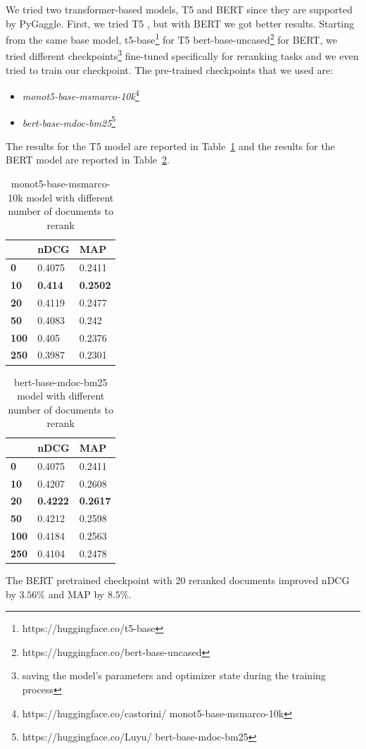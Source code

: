 We tried two transformer-based models, T5 and BERT since they are supported by PyGaggle. First, we tried T5 \cite{RaffelShazeerRobertsLeeNarangMatenaZhouLiLiuT5}, but with BERT \cite{devlin2019bert} we got better results. Starting from the same base model, t5-base\footnote{https://huggingface.co/t5-base} for T5 bert-base-uncased\footnote{https://huggingface.co/bert-base-uncased} for BERT, we tried different checkpoints\footnote{saving the model's parameters and optimizer state during the training process} fine-tuned specifically for reranking tasks and we even tried to train our checkpoint. The pre-trained checkpoints that we used are: 
\begin{itemize}
\item \textit{monot5-base-msmarco-10k}\footnote{https://huggingface.co/castorini/
monot5-base-msmarco-10k}
\item \textit{bert-base-mdoc-bm25}\footnote{https://huggingface.co/Luyu/
bert-base-mdoc-bm25}
\end{itemize}
The results for the T5 model are reported in Table~\ref{tab:t5-msmarco} and the results for the BERT model are reported in Table~\ref{tab:bert-mdoc}.
\begin{table}[tbp]
\caption{\label{tab:t5-msmarco} monot5-base-msmarco-10k model with different number of documents to rerank}
\begin{tabular}{|l|l|l|}
\toprule
             & \textbf{nDCG} & \textbf{MAP} \\ 
\midrule
\textbf{0}   & 0.4075        & 0.2411       \\ 
\textbf{10}  & \textbf{0.414}         & \textbf{0.2502}       \\ 
\textbf{20}  & 0.4119        & 0.2477       \\ 
\textbf{50}  & 0.4083        & 0.242        \\ 
\textbf{100} & 0.405         & 0.2376       \\ 
\textbf{250} & 0.3987        & 0.2301\\
\bottomrule
\end{tabular}
\end{table}

\begin{table}[tbp]
\caption{\label{tab:bert-mdoc}bert-base-mdoc-bm25 model with different number of documents to rerank}
\begin{tabular}{|l|l|l|}
\toprule
             & \textbf{nDCG} & \textbf{MAP} \\ 
\midrule
\textbf{0}   & 0.4075        & 0.2411       \\ 
\textbf{10}  & 0.4207         & 0.2608       \\ 
\textbf{20}  & \textbf{0.4222}        & \textbf{0.2617}       \\ 
\textbf{50}  & 0.4212        & 0.2598        \\ 
\textbf{100} & 0.4184         & 0.2563       \\ 
\textbf{250} & 0.4104        & 0.2478      \\
\bottomrule
\end{tabular}
\end{table}
The BERT pretrained checkpoint with 20 reranked documents improved \ac{nDCG} by $3.56\%$ and \ac{MAP} by $8.5\%$.

